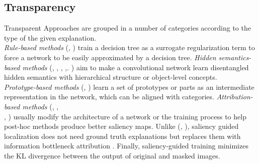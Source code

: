 \subsection{Transparency}
\label{rel:sub_transp}
Transparent 
Approaches are grouped in a number of categories according to the type of the given explanation. \\
\emph{Rule-based methods} (\cite{wu2018beyond}, \cite{wu2020regional}) train a decision tree as a 
surrogate regularization term to force a network to be easily approximated by a decision tree.
\emph{Hidden semantics-based methods} (\cite{bau2017network}, \cite{zhou2018interpreting}, 
\cite{zhang2018interpretable}, \cite{zhou2014object},\cite{bohle2022b}. \cite{bohle2024b}) aim to 
make a convolutional network learn disentangled hidden semantics with hierarchical structure or 
object-level concepts.\\
\emph{Prototype-based methods} (\cite{li2018deep}, \cite{chen2019looks}) learn a set of prototypes 
or parts as an intermediate representation in the network, which can be aligned with categories. 
\emph{Attribution-based methods} (\cite{ismail2021improving}, \cite{Zhou_2022_BMVC}, \\
\cite{ross2017right}, \cite{ghaeini2019saliency}) usually modify the architecture of a network or 
the training process to help post-hoc methods produce better saliency maps. Unlike 
(\cite{ross2017right}, \cite{ghaeini2019saliency}), saliency guided localization 
\autocite{Zhou_2022_BMVC} does not need ground truth explanations but replaces them with 
information bottleneck attribution \autocite{schulz2020restricting}. Finally, saliency-guided 
training \autocite{ismail2021improving} minimizes the KL divergence between the output of original 
and masked images.


